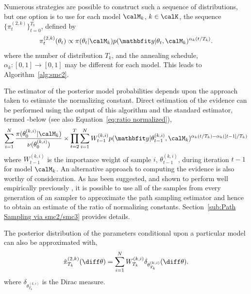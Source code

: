 Numerous strategies are possible to construct such a sequence of
distributions, but one option is to use for each model $\calM_k$, $k\in\calK$,
the sequence $\{\pi_t^{(2,k)}\}_{t=0}^{T_k}$, defined by
\begin{equation}
  \pi_t^{(2,k)}(\theta_t) \propto
  \pi(\theta_t|\calM_k)p(\data|\theta_t,\calM_k)^{\alpha_k(t/T_k)}.
  \label{eq:geometry_2}
\end{equation}
where the number of distribution $T_k$, and the annealing schedule,
$\alpha_k:[0,1]\to[0,1]$ may be different for each model. This leads to
Algorithm~\ref{alg:smc2}.


The estimator of the posterior model probabilities depends upon the approach
taken to estimate the normalizing constant. Direct estimation of the evidence
can be performed using the output of this \smc algorithm and the standard
estimator, termed \smc[2]-\ds below (see also Equation~\eqref{eq:ratio
  normalized}),
\begin{equation}\label{eq:smc2-ds}
  \sum_{i=1}^N \frac{\pi(\theta_0^{(k,i)}|\calM_k)}{\nu(\theta_0^{(k,i)})}
  \times \prod_{t=2}^T \sum_{i=1}^N W_{t-1}^{(k,i)}
  p(\data|\theta_{t-1}^{(k,i)},\calM_k)^{\alpha_k(t/T_k) - \alpha_k([t-1]/T_k)}
\end{equation}
where $W_{t-1}^{(k,i)}$ is the importance weight of sample $i$,
$\theta_{t-1}^{(k,i)}$, during iteration $t-1$ for model $\calM_k$. An
alternative approach to computing the evidence is also worthy of
consideration. As has been suggested, and shown to perform well empirically
previously \cite[see, for example]{Johansen:2006wm}, it is possible to use all
of the samples from every generation of an \smc sampler to approximate the
path sampling estimator and hence to obtain an estimate of the ratio of
normalizing constants. Section~\ref{sub:Path Sampling via smc2/smc3} provides
details.

The posterior distribution of the parameters conditional upon a particular
model can also be approximated with,
\begin{equation*}
  \hat{\pi}_{T_k}^{(2,k)}(\diff\theta) =
  \sum\limits_{i=1}^{N} W_{T_k}^{(k,i)}
  \delta_{\theta^{(k,i)}_{T_k}}(\diff\theta).
\end{equation*}
where $\delta_{\theta^{(k,i)}_{T_k}}$ is the Dirac measure.

